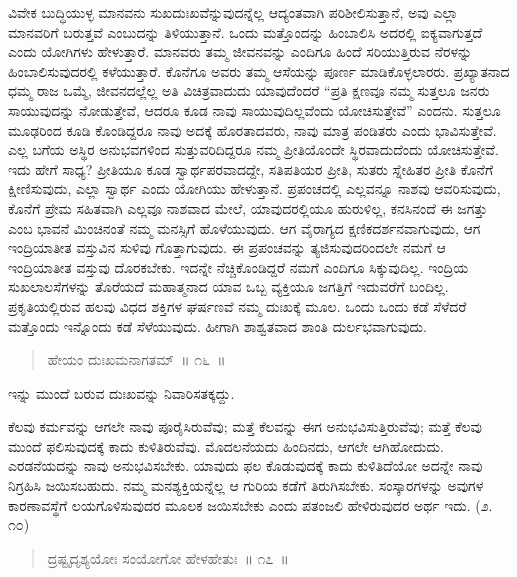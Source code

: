 ವಿವೇಕ ಬುದ್ಧಿಯುಳ್ಳ ಮಾನವನು ಸುಖದುಃಖವೆನ್ನುವುದನ್ನೆಲ್ಲ ಆದ್ಯಂತವಾಗಿ ಪರಿಶೀಲಿಸುತ್ತಾನೆ, ಅವು ಎಲ್ಲಾ ಮಾನವರಿಗೆ ಬರುತ್ತವೆ ಎಂಬುದನ್ನು ತಿಳಿಯುತ್ತಾನೆ. ಒಂದು ಮತ್ತೊಂದನ್ನು ಹಿಂಬಾಲಿಸಿ ಅದರಲ್ಲಿ ಐಕ್ಯವಾಗುತ್ತದೆ ಎಂದು ಯೋಗಿಗಳು ಹೇಳುತ್ತಾರೆ. ಮಾನವರು ತಮ್ಮ ಜೀವನವನ್ನು ಎಂದಿಗೂ ಹಿಂದೆ ಸರಿಯುತ್ತಿರುವ ನೆರಳನ್ನು ಹಿಂಬಾಲಿಸುವುದರಲ್ಲಿ ಕಳೆಯುತ್ತಾರೆ. ಕೊನೆಗೂ ಅವರು ತಮ್ಮ ಆಸೆಯನ್ನು ಪೂರ್ಣ ಮಾಡಿಕೊಳ್ಳಲಾರರು. ಪ್ರಖ್ಯಾತನಾದ ಧಮ್ಮ ರಾಜ ಒಮ್ಮೆ, ಜೀವನದಲ್ಲೆಲ್ಲ ಅತಿ ವಿಚಿತ್ರವಾದುದು ಯಾವುದೆಂದರೆ “ಪ್ರತಿ ಕ್ಷಣವೂ ನಮ್ಮ ಸುತ್ತಲೂ ಜನರು ಸಾಯುವುದನ್ನು ನೋಡುತ್ತೇವೆ, ಆದರೂ ಕೂಡ ನಾವು ಸಾಯುವುದಿಲ್ಲವೆಂದು ಯೋಚಿಸುತ್ತೇವೆ” ಎಂದನು. ಸುತ್ತಲೂ ಮೂಢರಿಂದ ಕೂಡಿ ಕೊಂಡಿದ್ದರೂ ನಾವು ಅದಕ್ಕೆ ಹೊರತಾದವರು, ನಾವು ಮಾತ್ರ ಪಂಡಿತರು ಎಂದು ಭಾವಿಸುತ್ತೇವೆ. ಎಲ್ಲ ಬಗೆಯ ಅಸ್ಥಿರ ಅನುಭವಗಳಿಂದ ಸುತ್ತುವರಿದಿದ್ದರೂ ನಮ್ಮ ಪ್ರೀತಿಯೊಂದೇ ಸ್ಥಿರವಾದುದೆಂದು ಯೋಚಿಸುತ್ತೇವೆ. ಇದು ಹೇಗೆ ಸಾಧ್ಯ? ಪ್ರೀತಿಯೂ ಕೂಡ ಸ್ವಾರ್ಥಪರವಾದದ್ದೇ, ಸತಿಪತಿಯರ ಪ್ರೀತಿ, ಸುತರು ಸ್ನೇಹಿತರ ಪ್ರೀತಿ ಕೊನೆಗೆ ಕ್ಷೀಣಿಸುವುದು, ಎಲ್ಲಾ ಸ್ವಾರ್ಥ ಎಂದು ಯೋಗಿಯು ಹೇಳುತ್ತಾನೆ. ಪ್ರಪಂಚದಲ್ಲಿ ಎಲ್ಲವನ್ನೂ ನಾಶವು ಆವರಿಸುವುದು, ಕೊನೆಗೆ ಪ್ರೇಮ ಸಹಿತವಾಗಿ ಎಲ್ಲವೂ ನಾಶವಾದ ಮೇಲೆ, ಯಾವುದರಲ್ಲಿಯೂ ಹುರುಳಿಲ್ಲ, ಕನಸಿನಂದೆ ಈ ಜಗತ್ತು ಎಂಬ ಭಾವನೆ ಮಿಂಚಿನಂತೆ ನಮ್ಮ ಮನಸ್ಸಿಗೆ ಹೊಳೆಯುವುದು. ಆಗ ವೈರಾಗ್ಯದ ಕ್ಷಣಿಕದರ್ಶನವಾಗುವುದು, ಆಗ ಇಂದ್ರಿಯಾತೀತ ವಸ್ತುವಿನ ಸುಳಿವು ಗೊತ್ತಾಗುವುದು. ಈ ಪ್ರಪಂಚವನ್ನು ತ್ಯಜಿಸುವುದರಿಂದಲೇ ನಮಗೆ ಆ ಇಂದ್ರಿಯಾತೀತ ವಸ್ತುವು ದೊರಕಬೇಕು. ಇದನ್ನೇ ನೆಚ್ಚಿಕೊಂಡಿದ್ದರೆ ನಮಗೆ ಎಂದಿಗೂ ಸಿಕ್ಕುವುದಿಲ್ಲ. ಇಂದ್ರಿಯ ಸುಖಲಾಲಸೆಗಳನ್ನು ತೊರೆಯದೆ ಮಹಾತ್ಮನಾದ ಯಾವ ಒಬ್ಬ ವ್ಯಕ್ತಿಯೂ ಜಗತ್ತಿಗೆ ಇದುವರೆಗೆ ಬಂದಿಲ್ಲ. ಪ್ರಕೃತಿಯಲ್ಲಿರುವ ಹಲವು ವಿಧದ ಶಕ್ತಿಗಳ ಘರ್ಷಣವೆ ನಮ್ಮ ದುಃಖಕ್ಕೆ ಮೂಲ. ಒಂದು ಒಂದು ಕಡೆ ಸೆಳೆದರೆ ಮತ್ತೊಂದು ಇನ್ನೊಂದು ಕಡೆ ಸೆಳೆಯುವುದು. ಹೀಗಾಗಿ ಶಾಶ್ವತವಾದ ಶಾಂತಿ ದುರ್ಲಭ\break ವಾಗುವುದು. 

\vspace{-0.3cm}

\begin{verse}
ಹೇಯಂ ದುಃಖಮನಾಗತಮ್​~॥ ೧೬~॥
\end{verse}

\vspace{-0.3cm}

ಇನ್ನು ಮುಂದೆ ಬರುವ ದುಃಖವನ್ನು ನಿವಾರಿಸತಕ್ಕದ್ದು. 

ಕೆಲವು ಕರ್ಮವನ್ನು ಆಗಲೇ ನಾವು ಪೂರೈಸಿರುವೆವು; ಮತ್ತೆ ಕೆಲವನ್ನು ಈಗ ಅನುಭವಿಸುತ್ತಿರುವೆವು; ಮತ್ತೆ ಕೆಲವು ಮುಂದೆ ಫಲಿಸುವುದಕ್ಕೆ ಕಾದು ಕುಳಿತಿರುವೆವು. ಮೊದಲನೆಯದು ಹಿಂದಿನದು, ಆಗಲೇ ಆಗಿಹೋದುದು. ಎರಡನೆಯದನ್ನು ನಾವು ಅನುಭವಿಸಬೇಕು. ಯಾವುದು ಫಲ ಕೊಡುವುದಕ್ಕೆ ಕಾದು ಕುಳಿತಿದೆಯೋ ಅದನ್ನೇ ನಾವು ನಿಗ್ರಹಿಸಿ ಜಯಿಸಬಹುದು. ನಮ್ಮ ಮನಶ್ಯಕ್ತಿಯನ್ನೆಲ್ಲ ಆ ಗುರಿಯ ಕಡೆಗೆ ತಿರುಗಿಸಬೇಕು. ಸಂಸ್ಕಾರಗಳನ್ನು ಅವುಗಳ ಕಾರಣಾವಸ್ಥೆಗೆ ಲಯಗೊಳಿಸುವುದರ ಮೂಲಕ ಜಯಿಸಬೇಕು ಎಂದು ಪತಂಜಲಿ ಹೇಳಿರುವುದರ ಅರ್ಥ ಇದು. (೨. ೧೦)

\vspace{-0.3cm}

\begin{verse}
ದ್ರಷ್ಟೃದೃಶ್ಯಯೋಃ ಸಂಯೋಗೋ ಹೇಳಹೇತುಃ~॥ ೧೭~॥
\end{verse}

